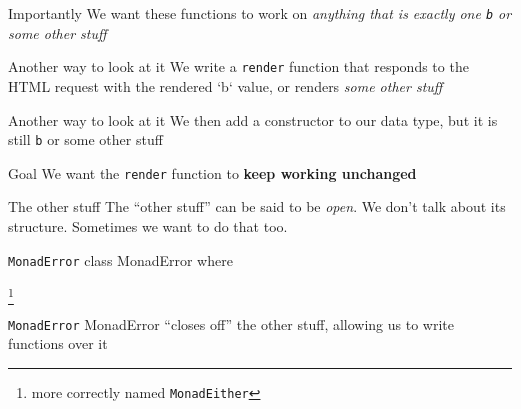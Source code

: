 \begin{frame}[fragile]
\begin{block}{Importantly}
We want these functions to work on \emph{anything that is exactly one \lstinline{b} or some other stuff}
\end{block}
\end{frame}

\begin{frame}[fragile]
\begin{block}{Another way to look at it}
We write a \lstinline{render} function that responds to the HTML request with the rendered `b` value, or renders \emph{some other stuff}
\end{block}
\end{frame}

\begin{frame}[fragile]
\begin{block}{Another way to look at it}
We then add a constructor to our data type, but it is still \lstinline{b} or some other stuff
\end{block}
\end{frame}

\begin{frame}[fragile]
\begin{block}{Goal}
We want the \lstinline{render} function to \textbf{keep working unchanged}
\end{block}
\end{frame}

\begin{frame}[fragile]
\begin{block}{The other stuff}
The ``other stuff'' can be said to be \emph{open}. We don't talk about its structure. Sometimes we want to do that too.
\end{block}
\end{frame}

\begin{frame}[fragile]
\begin{block}{\lstinline{MonadError}}
class MonadError where
\end{block}
\footnote{more correctly named \lstinline{MonadEither}}
\end{frame}

\begin{frame}[fragile]
\begin{block}{\lstinline{MonadError}}
MonadError ``closes off'' the other stuff, allowing us to write functions over it
\end{block}
\end{frame}

